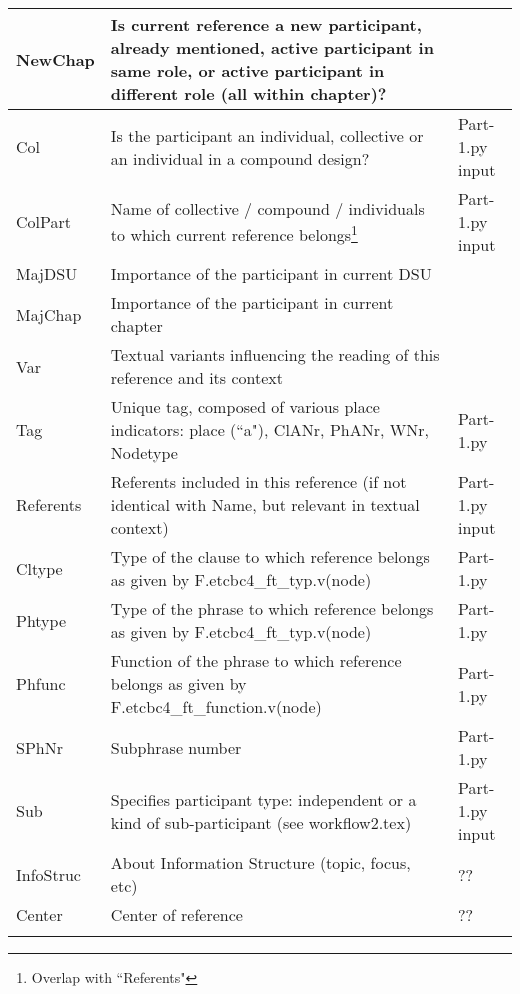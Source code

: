 \documentclass{article}
\begin{document}
\begin{longtable}{|l|p{}|l|}
NewChap & Is current reference a new participant, already mentioned, active participant in same role, or active participant in different role (all within chapter)?  & \\ \hline
Col & Is the participant an individual, collective or an individual in a compound design? & Part-1.py input \\ \hline
ColPart & Name of collective / compound / individuals to which current reference belongs\footnote{Overlap with ``Referents"} & Part-1.py input \\ \hline
MajDSU & Importance of the participant in current DSU & \\ \hline
MajChap & Importance of the participant in current chapter & \\ \hline
Var & Textual variants influencing the reading of this reference and its context & \\ \hline
Tag & Unique tag, composed of various place indicators: place (``a"), ClANr, PhANr, WNr, Nodetype & Part-1.py \\ \hline
Referents & Referents included in this reference (if not identical with Name, but relevant in textual context) & Part-1.py input \\ \hline
Cltype & Type of the clause to which reference belongs as given by F.etcbc4\_ft\_typ.v(node) & Part-1.py \\ \hline
Phtype & Type of the phrase to which reference belongs as given by F.etcbc4\_ft\_typ.v(node) & Part-1.py \\ \hline
Phfunc & Function of the phrase to which reference belongs as given by F.etcbc4\_ft\_function.v(node) & Part-1.py \\ \hline
SPhNr & Subphrase number & Part-1.py \\ \hline
Sub & Specifies participant type: independent or a kind of sub-participant (see workflow2.tex) & Part-1.py input \\ \hline
InfoStruc & About Information Structure (topic, focus, etc) & ?? \\ \hline
Center & Center of reference & ?? \\ \hline

\\ \hline


\end{longtable}
\end{document}

